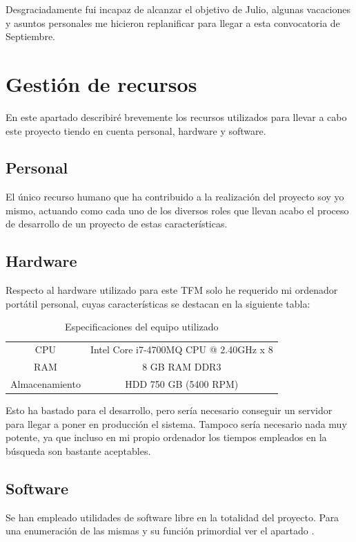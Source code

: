 Desgraciadamente fui incapaz de alcanzar el objetivo de Julio, algunas vacaciones y asuntos personales me hicieron replanificar para llegar a esta convocatoria de Septiembre.

\section{Gestión de recursos}
En este apartado describiré brevemente los recursos utilizados para llevar a cabo este proyecto tiendo en cuenta personal, hardware y software.

\subsection{Personal}
El único recurso humano que ha contribuido a la realización del proyecto soy yo mismo, actuando como cada uno de los diversos roles que llevan acabo el proceso de desarrollo de un proyecto de estas características.

\subsection{Hardware}
Respecto al hardware utilizado para este \acrshort{TFM} solo he requerido mi ordenador portátil personal, cuyas características se destacan en la siguiente tabla:

\begin{table} [h!]
	\centering
	\begin{tabular}{c c}
		\hline
		     CPU       & Intel \textregistered  Core \texttrademark  i7-4700MQ CPU @ 2.40GHz x 8 \\
		     RAM       & 8 GB RAM DDR3                                                           \\
		Almacenamiento & HDD 750 GB (5400 RPM)                                                   \\ \hline
	\end{tabular}
	\caption{Especificaciones del equipo utilizado}
\end{table}

Esto ha bastado para el desarrollo, pero sería necesario conseguir un servidor para llegar a poner en producción el sistema. Tampoco sería necesario nada muy potente, ya que incluso en mi propio ordenador los tiempos empleados en la búsqueda son bastante aceptables.

\subsection{Software}
Se han empleado utilidades de software libre en la totalidad del proyecto. Para una enumeración de las mismas y su función primordial ver el apartado .

